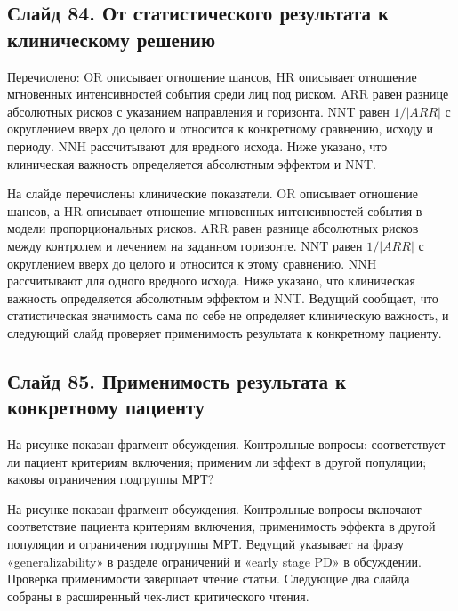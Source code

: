 \documentclass[11pt,a4paper]{article}
\begin{document}
\subsection*{Слайд 84. От статистического результата к клиническому решению}
\begin{onslide}
Перечислено: OR описывает отношение шансов, HR описывает отношение мгновенных интенсивностей события среди лиц под риском. ARR равен разнице абсолютных рисков с указанием направления и горизонта. NNT равен $1/|ARR|$ с округлением вверх до целого и относится к конкретному сравнению, исходу и периоду. NNH рассчитывают для вредного исхода. Ниже указано, что клиническая важность определяется абсолютным эффектом и NNT.
\end{onslide}
На слайде перечислены клинические показатели. OR описывает отношение шансов, а HR описывает отношение мгновенных интенсивностей события в модели пропорциональных рисков. ARR равен разнице абсолютных рисков между контролем и лечением на заданном горизонте. NNT равен $1/|ARR|$ с округлением вверх до целого и относится к этому сравнению. NNH рассчитывают для одного вредного исхода. Ниже указано, что клиническая важность определяется абсолютным эффектом и NNT. Ведущий сообщает, что статистическая значимость сама по себе не определяет клиническую важность, и следующий слайд проверяет применимость результата к конкретному пациенту.

\subsection*{Слайд 85. Применимость результата к конкретному пациенту}
\begin{onslide}
На рисунке показан фрагмент обсуждения. Контрольные вопросы: соответствует ли пациент критериям включения; применим ли эффект в другой популяции; каковы ограничения подгруппы МРТ?
\end{onslide}
На рисунке показан фрагмент обсуждения. Контрольные вопросы включают соответствие пациента критериям включения, применимость эффекта в другой популяции и ограничения подгруппы МРТ. Ведущий указывает на фразу «generalizability» в разделе ограничений и «early stage PD» в обсуждении. Проверка применимости завершает чтение статьи. Следующие два слайда собраны в расширенный чек-лист критического чтения.
\end{document}
